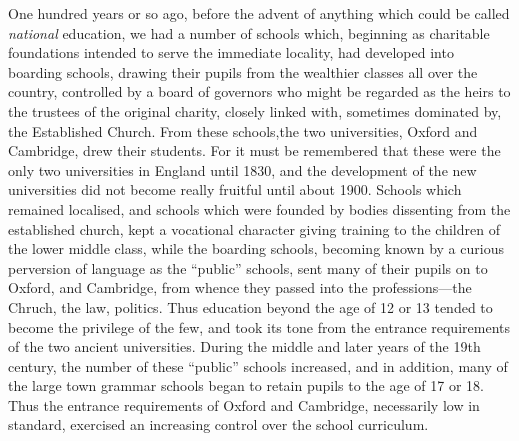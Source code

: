 One hundred years or so ago, before the advent of anything which could be called {\em national} education, we had a number of schools which, beginning as charitable foundations intended to serve the immediate locality, had developed into boarding schools, drawing their pupils from the wealthier classes all over the country, controlled by a board of governors who might be regarded as the heirs to the trustees of the original charity, closely linked with, sometimes dominated by, the Established Church. From these schools,\pageoriginale the two universities, Oxford and Cambridge, drew their students. For it must be remembered that these were the only two universities in England until 1830, and the development of the new universities did not become really fruitful until about 1900. Schools which remained localised, and schools which were founded by bodies dissenting from the established church, kept a vocational character giving training to the children of the lower middle class, while the boarding schools, becoming known by a curious perversion of language as the ``public'' schools, sent many of their pupils on to Oxford, and Cambridge, from whence they passed into the professions---the Chruch, the law, politics. Thus education beyond the age of 12 or 13 tended to become the privilege of the few, and took its tone from the entrance requirements of the two ancient universities. During the middle and later years of the 19th century, the number of these ``public'' schools increased, and in addition, many of the large town grammar schools began to retain pupils to the age of 17 or 18. Thus the entrance requirements of Oxford and Cambridge, necessarily low in standard, exercised an increasing control over the school curriculum.

